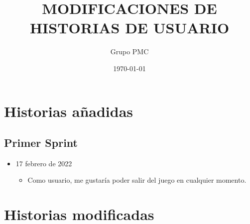 \documentclass{article}
\title{MODIFICACIONES DE HISTORIAS DE USUARIO}
\date{\today}
\author{Grupo PMC}
\begin{document}
\maketitle

\section{Historias añadidas}

\subsection{Primer Sprint}

\begin{itemize}
  \item 17 febrero de 2022
  \begin{itemize}
    \item Como usuario, me gustaría poder salir del juego en cualquier
    momento.
  \end{itemize}
\end{itemize}

\section{Historias modificadas}
\end{document}
